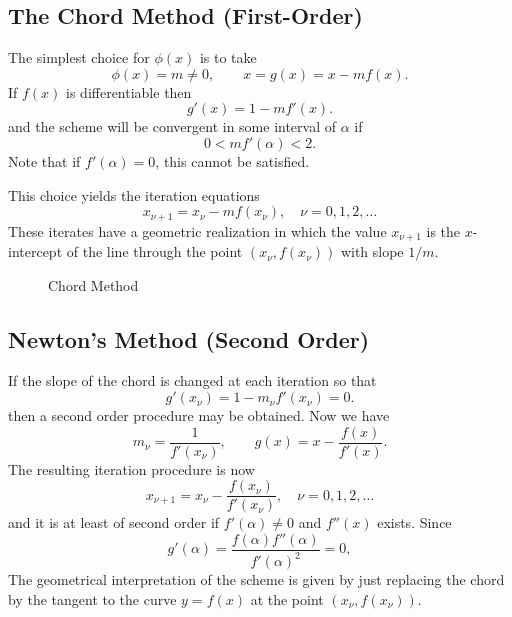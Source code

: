 \documentclass[../main.tex]{subfiles}
\begin{document}
\subsection{The Chord Method (First-Order)}
The simplest choice for $\phi(x)$ is to take
\begin{equation}
	\phi(x) = m \neq 0, \qquad x = g(x) = x - m f(x).
\end{equation}
If $f(x)$ is differentiable then
\begin{equation*}
	g'(x) = 1 - m f'(x).
\end{equation*}
and the scheme will be convergent in some interval of $\alpha$ if
\begin{equation*}
	0 < m f'(\alpha) < 2.
\end{equation*}
Note that if $f'(\alpha) = 0$, this cannot be satisfied.

This choice yields the iteration equations
\begin{equation}
	x_{\nu+1} = x_\nu - m f(x_\nu), \quad \nu = 0, 1, 2, \ldots
\end{equation}
These iterates have a geometric realization in which the value $x_{\nu+1}$ is the $x$-intercept of the line through the point $(x_\nu, f(x_\nu))$ with slope $1/m$.

\begin{figure}[ht]
	\centering
	\caption{Chord Method}
	\label{fig:chord-method}
\end{figure}

\subsection{Newton's Method (Second Order)}
If the slope of the chord is changed at each iteration so that
\begin{equation}
	g'(x_\nu) = 1 - m_{\nu}f'(x_{\nu}) = 0.
\end{equation}
then a second order procedure may be obtained. Now we have
\begin{equation*}
	m_{\nu} = \frac{1}{f'(x_{\nu})}, \qquad g(x) = x - \frac{f(x)}{f'(x)}.
\end{equation*}
The resulting iteration procedure is now
\begin{equation}
	x_{\nu+1} = x_\nu - \frac{f(x_\nu)}{f'(x_\nu)}, \quad \nu = 0, 1, 2, \ldots
\end{equation}
and it is at least of second order if $f'(\alpha) \neq 0$ and $f''(x)$ exists. Since
\begin{equation}
	g'(\alpha) = \frac{f(\alpha) f''(\alpha)}{f'(\alpha)^2} = 0,
\end{equation}
The geometrical interpretation of the scheme is given by just replacing the chord by the tangent to the curve $y = f(x)$ at the point $(x_\nu, f(x_\nu))$.
\end{document}
